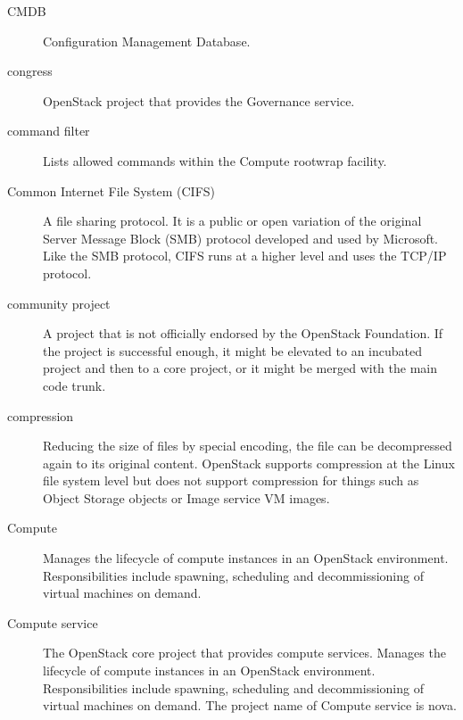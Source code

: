 \documentclass[letterpaper,10pt,english]{sphinxmanual}
\begin{document}
\begin{description}
\item[{CMDB}] \leavevmode{}\label{_source/glossary:term-cmdb}
Configuration Management Database.

\item[{congress}] \leavevmode{}\label{_source/glossary:term-congress}
OpenStack project that provides the Governance service.

\item[{command filter}] \leavevmode{}\label{_source/glossary:term-command-filter}
Lists allowed commands within the Compute rootwrap
facility.

\item[{Common Internet File System (CIFS)}] \leavevmode{}\label{_source/glossary:term-common-internet-file-system-cifs}
A file sharing protocol. It is a public or open variation of the
original Server Message Block (SMB) protocol developed and used by
Microsoft. Like the SMB protocol, CIFS runs at a higher level and uses
the TCP/IP protocol.

\item[{community project}] \leavevmode{}\label{_source/glossary:term-community-project}
A project that is not officially endorsed by the OpenStack
Foundation. If the project is successful enough, it might be elevated
to an incubated project and then to a core project, or it might be
merged with the main code trunk.

\item[{compression}] \leavevmode{}\label{_source/glossary:term-compression}
Reducing the size of files by special encoding, the file can be
decompressed again to its original content. OpenStack supports
compression at the Linux file system level but does not support
compression for things such as Object Storage objects or Image service
VM images.

\item[{Compute}] \leavevmode{}\label{_source/glossary:term-compute}
Manages the lifecycle of compute instances in an OpenStack environment.
Responsibilities include spawning, scheduling and decommissioning of
virtual machines on demand.

\item[{Compute service}] \leavevmode{}\label{_source/glossary:term-compute-service}
The OpenStack core project that provides compute services. Manages the
lifecycle of compute instances in an OpenStack environment. Responsibilities
include spawning, scheduling and decommissioning of virtual machines on demand.
The project name of Compute service is nova.


\end{description}
\end{document}
